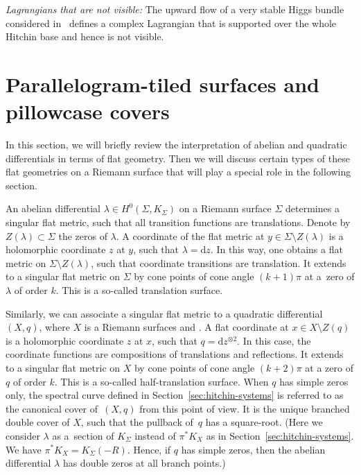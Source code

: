 \documentclass[pdftex]{sigma}
\numberwithin{equation}{section}
\theoremstyle{definition}
\renewcommand{\d}{\mathrm{d}}
\begin{document}
\textit{Lagrangians that are not visible:} The upward flow of a very stable Higgs bundle considered in~\cite{HauselHitchin, PaulyPeon} defines a complex Lagrangian that is supported over the whole Hitchin base and hence is not visible.

\section{Parallelogram-tiled surfaces and pillowcase covers}\label{sec:rhomb-tiled-surf}

In this section, we will briefly review the interpretation of abelian and quadratic differentials in terms of flat geometry. Then we will discuss certain types of these flat geometries on a Riemann surface that will play a special role in the following section.

An abelian differential $\lambda \in H^0(\Sigma,K_\Sigma)$ on a Riemann surface $\Sigma$ determines a singular flat metric, such that all transition functions are translations. Denote by $Z(\lambda) \subset \Sigma$ the zeros of $\lambda$. A coordinate of the flat metric at $y \in \Sigma \setminus Z(\lambda)$ is a holomorphic coordinate $z$ at $y$, such that $\lambda= \d z$. In this way, one obtains a flat metric on $\Sigma\setminus Z(\lambda)$, such that coordinate transitions are translation. It extends to a singular flat metric on $\Sigma$ by cone points of cone angle $(k+1)\pi$ at a~zero of $\lambda$ of order $k$. This is a so-called translation surface.

Similarly, we can associate a singular flat metric to a quadratic differential $(X,q)$, where $X$ is a Riemann surfaces and . A flat coordinate at $x \in X\setminus Z(q)$ is a holomorphic coordinate $z$ at $x$, such that $q= \d z ^{\otimes 2}$. In this case, the coordinate functions are compositions of translations and reflections. It extends to a singular flat metric on $X$ by cone points of cone angle $(k+2)\pi$ at a zero of $q$ of order $k$. This is a so-called half-translation surface. When $q$ has simple zeros only, the spectral curve defined in Section~\ref{sec:hitchin-systems} is referred to as the canonical cover of~$(X,q)$ from this point of view. It is the unique branched double cover of $X$, such that the pullback of~$q$ has a square-root. (Here we consider $\lambda$ as a~section of $K_\Sigma$ instead of $\pi^*K_X$ as in Section~\ref{sec:hitchin-systems}. We have $\pi^*K_X=K_\Sigma(-R)$. Hence, if $q$ has simple zeros, then the abelian differential $\lambda$ has double zeros at all branch points.)
\end{document}
